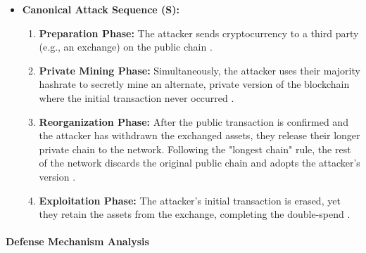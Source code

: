 \begin{itemize}
    \item \textbf{Canonical Attack Sequence (S):}
    \begin{enumerate}
        \item \textbf{Preparation Phase:} The attacker sends cryptocurrency to a third party (e.g., an exchange) on the public chain \cite{casino2019}.
        \item \textbf{Private Mining Phase:} Simultaneously, the attacker uses their majority hashrate to secretly mine an alternate, private version of the blockchain where the initial transaction never occurred \cite{eyal2014}.
        \item \textbf{Reorganization Phase:} After the public transaction is confirmed and the attacker has withdrawn the exchanged assets, they release their longer private chain to the network. Following the "longest chain" rule, the rest of the network discards the original public chain and adopts the attacker's version \cite{wang2019}.
        \item \textbf{Exploitation Phase:} The attacker's initial transaction is erased, yet they retain the assets from the exchange, completing the double-spend \cite{casino2019}.
    \end{enumerate}
\end{itemize}

\paragraph{Defense Mechanism Analysis}

